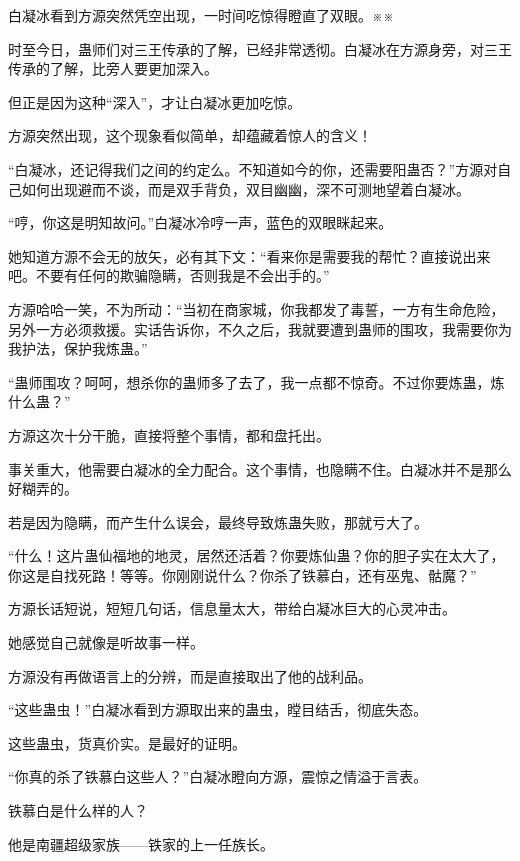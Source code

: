 
\begin{this_body}



白凝冰看到方源突然凭空出现，一时间吃惊得瞪直了双眼。※※

时至今日，蛊师们对三王传承的了解，已经非常透彻。白凝冰在方源身旁，对三王传承的了解，比旁人要更加深入。

但正是因为这种“深入”，才让白凝冰更加吃惊。

方源突然出现，这个现象看似简单，却蕴藏着惊人的含义！

“白凝冰，还记得我们之间的约定么。不知道如今的你，还需要阳蛊否？”方源对自己如何出现避而不谈，而是双手背负，双目幽幽，深不可测地望着白凝冰。

“哼，你这是明知故问。”白凝冰冷哼一声，蓝色的双眼眯起来。

她知道方源不会无的放矢，必有其下文：“看来你是需要我的帮忙？直接说出来吧。不要有任何的欺骗隐瞒，否则我是不会出手的。”

方源哈哈一笑，不为所动：“当初在商家城，你我都发了毒誓，一方有生命危险，另外一方必须救援。实话告诉你，不久之后，我就要遭到蛊师的围攻，我需要你为我护法，保护我炼蛊。”

“蛊师围攻？呵呵，想杀你的蛊师多了去了，我一点都不惊奇。不过你要炼蛊，炼什么蛊？”

方源这次十分干脆，直接将整个事情，都和盘托出。

事关重大，他需要白凝冰的全力配合。这个事情，也隐瞒不住。白凝冰并不是那么好糊弄的。

若是因为隐瞒，而产生什么误会，最终导致炼蛊失败，那就亏大了。

“什么！这片蛊仙福地的地灵，居然还活着？你要炼仙蛊？你的胆子实在太大了，你这是自找死路！等等。你刚刚说什么？你杀了铁慕白，还有巫鬼、骷魔？”

方源长话短说，短短几句话，信息量太大，带给白凝冰巨大的心灵冲击。

她感觉自己就像是听故事一样。

方源没有再做语言上的分辨，而是直接取出了他的战利品。

“这些蛊虫！”白凝冰看到方源取出来的蛊虫，瞠目结舌，彻底失态。

这些蛊虫，货真价实。是最好的证明。

“你真的杀了铁慕白这些人？”白凝冰瞪向方源，震惊之情溢于言表。

铁慕白是什么样的人？

他是南疆超级家族——铁家的上一任族长。


\end{this_body}
